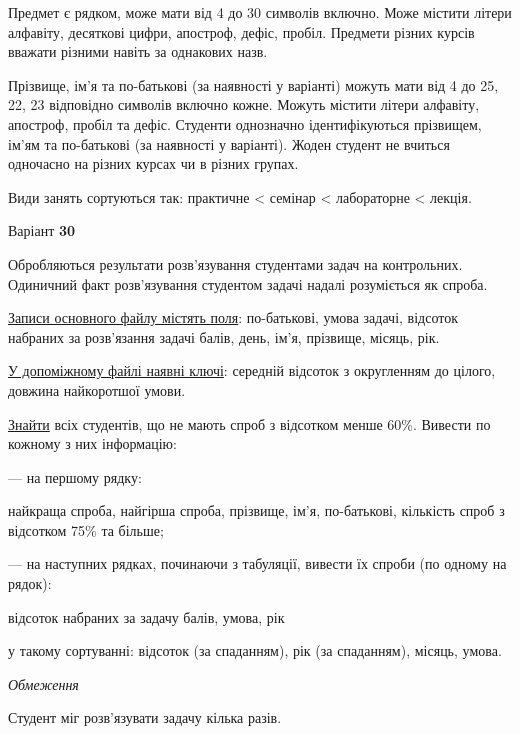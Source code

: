 \documentclass[11pt, ukrainian]{article}
\begin{document}
Предмет є рядком, може мати від 4 до 30 символів включно.
Може містити літери алфавіту, десяткові цифри, апостроф, дефіс, пробіл.
Предмети різних курсів вважати різними навіть за однакових назв.

Прізвище, ім’я та по-батькові (за наявності у варіанті)
можуть мати від 4 до 25, 22, 23 відповідно символів включно кожне.
Можуть містити літери алфавіту, апостроф, пробіл та дефіс.
Студенти однозначно ідентифікуються прізвищем, ім’ям та по-батькові (за наявності у варіанті).
Жоден студент не вчиться одночасно на різних курсах чи в різних групах.

Види занять сортуються так: практичне < семінар < лабораторне < лекція.





\par
\newpage
{\center Варіант  \No \textbf { 30 }\par}
\bigskip
Обробляються результати розв’язування студентами задач на контрольних.
Одиничний факт роз\-в’я\-зу\-вання студентом задачі надалі розуміється як спроба.

\underline{Записи основного файлу містять поля}: по-батькові, умова задачі, відсоток набраних за розв’язання задачі балів, день, ім’я, прізвище, місяць, рік.

\underline{У допоміжному файлі наявні ключі}: середній відсоток з округленням до цілого, довжина найкоротшої умови.

\underline{Знайти} всіх студентів, що не мають спроб з відсотком менше 60\%. Вивести по кожному з них інформацію:\par
{\noindent}--- на першому рядку:\par
найкраща спроба, найгірша спроба, прізвище, ім’я, по-батькові, кількість спроб з відсотком 75\% та більше;

{\noindent}--- на наступних рядках, починаючи з табуляції, вивести їх спроби (по одному на рядок):\par
відсоток набраних за задачу балів, умова, рік

{\noindent}у такому сортуванні: відсоток (за спаданням), рік (за спаданням), місяць, умова.


\bigskip\textit{Обмеження}

Студент міг розв’язувати задачу кілька разів.
\end{document}
